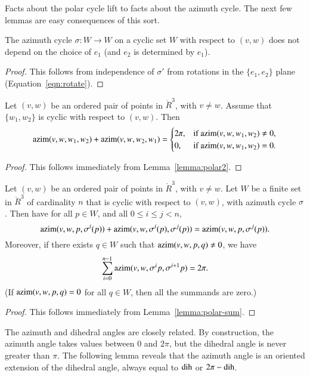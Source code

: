 Facts about the polar cycle lift to facts about the azimuth cycle.
The next few lemmas are easy consequences of this sort.


\begin{lemma} The azimuth cycle $\sigma:W\to W$ on
a cyclic set $W$ with respect to $(v,w)$ does not depend
on the choice of $e_1$ (and $e_2$ is determined by $e_1$).
\end{lemma}

\begin{proof} This follows from independence of $\sigma'$ from
rotations in the $\{e_1,e_2\}$ plane  (Equation~\ref{eqn:rotate}).
\end{proof}


\begin{lemma} Let $(v,w)$ be an ordered pair of points in $\ring{R}^3$,
with $v\ne w$.  Assume that $\{w_1,w_2\}$ is cyclic
with respect to $(v,w)$.  Then
  $$
  {\operatorname{azim}}(v,w,w_1,w_2) + {\operatorname{azim}}(v,w,w_2,w_1) 
  = \begin{cases} 2\pi, & \text{if }{\operatorname{azim}}(v,w,w_1,w_2)\ne 0,\\
    0, & \text{if }{\operatorname{azim}}(v,w,w_1,w_2)=0.
    \end{cases}
    $$
\end{lemma}

\begin{proof} This follows immediately from Lemma~\ref{lemma:polar2}.
\end{proof}

\begin{lemma} 
Let $(v,w)$ be an ordered pair of points in $\ring{R}^3$,
with $v\ne w$.  Let $W$ be a finite set in $\ring{R}^3$ of
cardinality $n$ that
is cyclic with respect to $(v,w)$,
with azimuth cycle $\sigma$.
Then have for all $p\in W$,
and all $0\le i \le j < n$,
   $$
   {\operatorname{azim}}(v,w,p,\sigma^i(p)) +
    {\operatorname{azim}}(v,w,\sigma^i(p),\sigma^j(p)) =
   {\operatorname{azim}}(v,w,p,\sigma^j(p)).
   $$
Moreover, if there exists $q\in W$ such that 
${\operatorname{azim}}(v,w,p,q)\ne0$,
we have 
  $$
  \sum_{i=0}^{n-1} {\operatorname{azim}}(v,w,\sigma^ip,\sigma^{i+1}p) = 2\pi.
  $$
(If ${\operatorname{azim}}(v,w,p,q)=0$ for all $q\in W$, then all the
summands are zero.)
\end{lemma}

\begin{proof} This follows immediately from 
Lemma~\ref{lemma:polar-sum}.
\end{proof}


The azimuth and dihedral angles are closely related.   By construction,
the azimuth angle takes values between $0$ and $2\pi$, but the dihedral
angle is never greater than $\pi$.  The following lemma reveals that
the azimuth angle is an oriented extension of the dihedral angle, always
equal to $\operatorname{dih}$ or $2\pi - \operatorname{dih}$.



